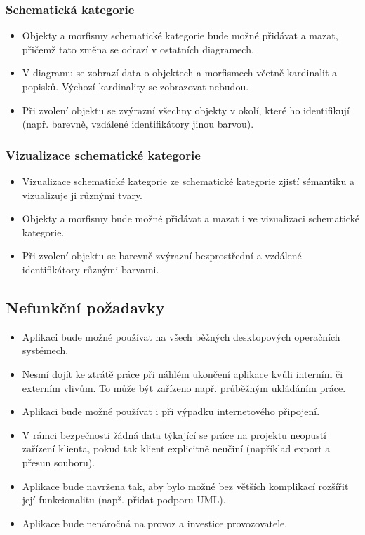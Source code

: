 \subsubsection*{Schematická kategorie}
\begin{itemize}
  \item Objekty a morfismy schematické kategorie bude možné přidávat a mazat, přičemž tato změna se odrazí v ostatních diagramech.
  \item V diagramu se zobrazí data o objektech a morfismech včetně kardinalit a popisků.
        Výchozí kardinality \oneone{} se zobrazovat nebudou.
  \item Při zvolení objektu se zvýrazní všechny objekty v okolí, které ho identifikují (např. barevně, vzdálené identifikátory jinou barvou).
\end{itemize}

\subsubsection*{Vizualizace schematické kategorie}
\begin{itemize}
  \item Vizualizace schematické kategorie ze schematické kategorie zjistí sémantiku a vizualizuje ji různými tvary.
  \item Objekty a morfismy bude možné přidávat a mazat i ve vizualizaci schematické kategorie.
  \item Při zvolení objektu se barevně zvýrazní bezprostřední a vzdálené identifikátory různými barvami.
\end{itemize}

\subsection{Nefunkční požadavky}

\begin{itemize}
  \item Aplikaci bude možné používat na všech běžných desktopových operačních systémech.
  \item Nesmí dojít ke ztrátě práce při náhlém ukončení aplikace kvůli interním či externím vlivům.
        To může být zařízeno např. průběžným ukládáním práce.
  \item Aplikaci bude možné používat i při výpadku internetového připojení.
  \item V rámci bezpečnosti žádná data týkající se práce na projektu neopustí zařízení klienta, pokud tak klient explicitně neučiní (například export a přesun souboru).
  \item Aplikace bude navržena tak, aby bylo možné bez větších komplikací rozšířit její funkcionalitu (např. přidat podporu UML).
  \item Aplikace bude nenáročná na provoz a investice provozovatele.
\end{itemize}

